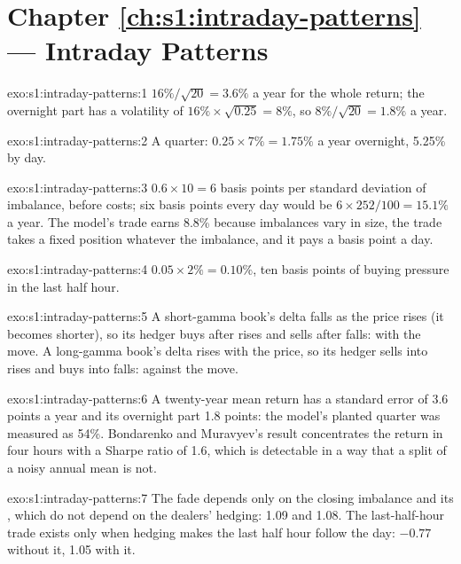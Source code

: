 \section*{Chapter \ref{ch:s1:intraday-patterns} --- Intraday Patterns}

\begin{solution}{exo:s1:intraday-patterns:1}
$16\%/\sqrt{20} = 3.6\%$ a year for the whole return; the overnight part has a volatility of $16\% \times \sqrt{0.25} = 8\%$, so $8\%/\sqrt{20} = 1.8\%$ a year.
\end{solution}

\begin{solution}{exo:s1:intraday-patterns:2}
A quarter: $0.25 \times 7\% = 1.75\%$ a year overnight, 5.25\% by day.
\end{solution}

\begin{solution}{exo:s1:intraday-patterns:3}
$0.6 \times 10 = 6$ basis points per standard deviation of imbalance, before costs; six basis points every day would be $6 \times 252/100 = 15.1\%$ a year. The
model's trade earns 8.8\% because imbalances vary in size, the trade takes a fixed position whatever the imbalance, and it pays a basis point a day.
\end{solution}

\begin{solution}{exo:s1:intraday-patterns:4}
$0.05 \times 2\% = 0.10\%$, ten basis points of buying pressure in the last half hour.
\end{solution}

\begin{solution}{exo:s1:intraday-patterns:5}
A short-gamma book's delta falls as the price rises (it becomes shorter), so its hedger buys after rises and sells after falls: with the move. A long-gamma
book's delta rises with the price, so its hedger sells into rises and buys into falls: against the move.
\end{solution}

\begin{solution}{exo:s1:intraday-patterns:6}
A twenty-year mean return has a standard error of 3.6 points a year and its overnight part 1.8 points: the model's planted quarter was measured as 54\%.
Bondarenko and Muravyev's result concentrates the return in four hours with a Sharpe ratio of 1.6, which is detectable in a way that a split of a noisy
annual mean is not.
\end{solution}

\begin{solution}{exo:s1:intraday-patterns:7}
The fade depends only on the closing imbalance and its , which do not depend on the dealers' hedging: 1.09 and 1.08. The last-half-hour
trade exists only when hedging makes the last half hour follow the day: $-0.77$ without it, 1.05 with it.
\end{solution}

